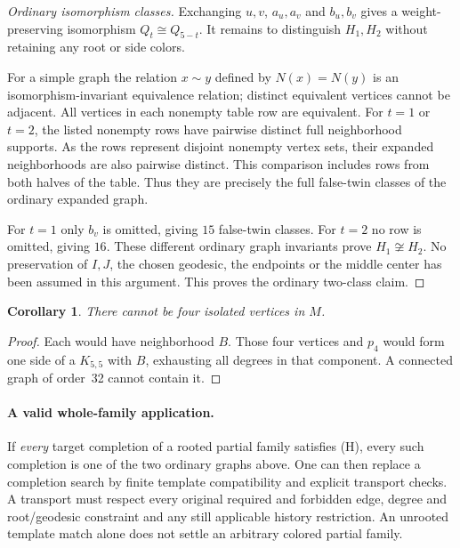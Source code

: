 \documentclass[11pt]{article}
\newtheorem{corollary}[theorem]{Corollary}
\begin{document}
\begin{proof}[Ordinary isomorphism classes]
Exchanging $u,v$, $a_u,a_v$ and $b_u,b_v$ gives a weight-preserving
isomorphism $Q_t\cong Q_{5-t}$. It remains to distinguish $H_1,H_2$
without retaining any root or side colors.

For a simple graph the relation $x\sim y$ defined by $N(x)=N(y)$
is an isomorphism-invariant equivalence relation; distinct equivalent
vertices cannot be adjacent. All vertices in each nonempty table row
are equivalent. For $t=1$ or $t=2$, the listed nonempty rows have
pairwise distinct full neighborhood supports. As the rows represent
disjoint nonempty vertex sets, their expanded neighborhoods are also
pairwise distinct. This comparison includes rows from both halves of
the table. Thus they are precisely the full false-twin classes of the
ordinary expanded graph.

For $t=1$ only $b_v$ is omitted, giving $15$ false-twin classes.
For $t=2$ no row is omitted, giving $16$. These different ordinary
graph invariants prove $H_1\not\cong H_2$. No preservation of $I,J$,
the chosen geodesic, the endpoints or the middle center has been
assumed in this argument. This proves the ordinary two-class claim.
\end{proof}

\begin{corollary}\label{four}
There cannot be four isolated vertices in $M$.
\end{corollary}
\begin{proof}
Each would have neighborhood $B$. Those four vertices and $p_4$
would form one side of a $K_{5,5}$ with $B$, exhausting all degrees
in that component. A connected graph of order~32 cannot contain it.
\end{proof}

\paragraph{A valid whole-family application.}
If \emph{every} target completion of a rooted partial family satisfies
\textup{(H)}, every such completion is one of the two ordinary graphs
above. One can then replace a completion search by finite template
compatibility and explicit transport checks. A transport must respect
every original required and forbidden edge, degree and root/geodesic
constraint and any still applicable history restriction. An unrooted
template match alone does not settle an arbitrary colored partial family.
\end{document}
